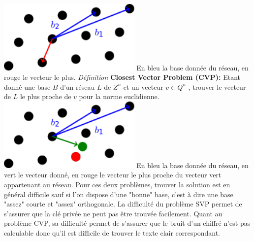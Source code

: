 \documentclass[a4paper,12pt]{report}
\begin{document}
\hspace*{3.5cm}{}\includegraphics[width=7cm]{svp.png}\newline
\newline
\hspace*{3.5cm} En bleu la base donnée du réseau, en rouge le vecteur le plus.\newline
\newline
\textit{Définition} \textbf{Closest Vector Problem (CVP):}\newline
Etant donné une base $B$ d’un réseau $L$ de $Z^n$ et un vecteur $v \in Q^n$ , trouver le vecteur de $L$ le plus proche de $v$ pour la norme euclidienne.\newline
\newline
\hspace*{5cm}{}\includegraphics[width=7cm]{cvp.png}\newline
\newline
\hspace*{3.5cm} En bleu la base donnée du réseau, en vert le vecteur donné,\newline
\hspace*{3.5cm} en rouge le vecteur le plus proche du vecteur vert appartenant au réseau.\newline
\newline
Pour ces deux problèmes, trouver la solution est en général difficile sauf si l’on dispose d’une "bonne" base, c’est à dire une base "assez" courte et "assez" orthogonale. La difficulté du problème SVP permet de s’assurer que la clé privée ne peut pas être trouvée facilement. Quant au problème CVP, sa difficulté permet de s’assurer que le bruit d’un chiffré n’est pas calculable donc qu’il est difficile de trouver le texte clair correspondant.\newline
\end{document}
